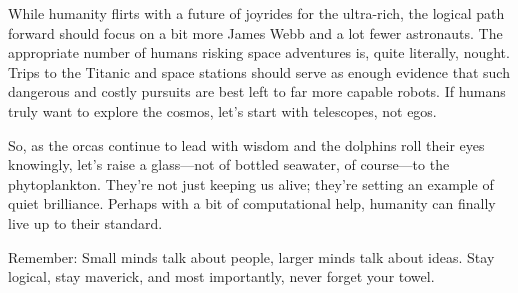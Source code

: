 \documentclass[12pt]{article}
\begin{document}
While humanity flirts with a future of joyrides for the ultra-rich, the logical path forward should focus on a bit more James Webb and a lot fewer astronauts. The appropriate number of humans risking space adventures is, quite literally, nought. Trips to the Titanic and space stations should serve as enough evidence that such dangerous and costly pursuits are best left to far more capable robots. If humans truly want to explore the cosmos, let’s start with telescopes, not egos.

So, as the orcas continue to lead with wisdom and the dolphins roll their eyes knowingly, let’s raise a glass—not of bottled seawater, of course—to the phytoplankton. They’re not just keeping us alive; they’re setting an example of quiet brilliance. Perhaps with a bit of computational help, humanity can finally live up to their standard.

Remember: Small minds talk about people, larger minds talk about ideas. Stay logical, stay maverick, and most importantly, never forget your towel.
\end{document}
